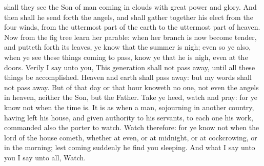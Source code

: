 shall they see the Son of man coming in clouds with great power and glory. And then shall he send forth the angels, and shall gather together his elect from the four winds, from the uttermost part of the earth to the uttermost part of heaven.  Now from the fig tree learn her parable: when her branch is now become tender, and putteth forth its leaves, ye know that the summer is nigh; even so ye also, when ye see these things coming to pass, know ye that he is nigh, even at the doors. Verily I say unto you, This generation shall not pass away, until all these things be accomplished. Heaven and earth shall pass away: but my words shall not pass away. But of that day or that hour knoweth no one, not even the angels in heaven, neither the Son, but the Father.  Take ye heed, watch and pray: for ye know not when the time is. It is as when a man, sojourning in another country, having left his house, and given authority to his servants, to each one his work, commanded also the porter to watch. Watch therefore: for ye know not when the lord of the house cometh, whether at even, or at midnight, or at cockcrowing, or in the morning; lest coming suddenly he find you sleeping. And what I say unto you I say unto all, Watch. 

